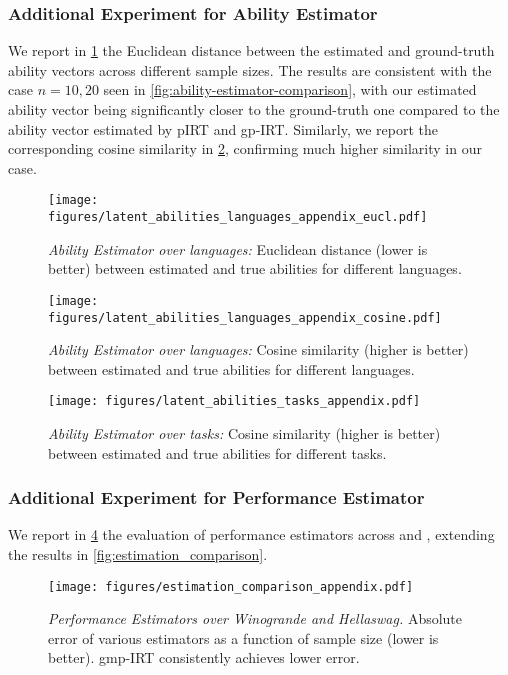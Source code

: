 \subsubsection{Additional Experiment for Ability Estimator}
We report in \cref{fig:ability-estimator-comparison-all} the Euclidean distance between the estimated and ground-truth ability vectors across different sample sizes. The results are consistent with the case $n=10, 20$ seen in \cref{fig:ability-estimator-comparison}, with our estimated ability vector being significantly closer to the ground-truth one compared to the ability vector estimated by pIRT and gp-IRT. Similarly, we report the corresponding cosine similarity in \cref{fig:ability-estimator-comparison-cosine}, confirming much higher similarity in our case.  
%
\begin{figure}
    \texttt{[image: figures/latent\_abilities\_languages\_appendix\_eucl.pdf]}
    \caption{\textit{Ability Estimator over languages:} Euclidean distance (lower is better) between estimated and true abilities for different languages.}
    \label{fig:ability-estimator-comparison-all}
\end{figure}
%
\begin{figure}
    \texttt{[image: figures/latent\_abilities\_languages\_appendix\_cosine.pdf]}
    \caption{\textit{Ability Estimator over languages:} Cosine similarity (higher is better) between estimated and true abilities for different languages.}
    \label{fig:ability-estimator-comparison-cosine}
\end{figure}
%
\begin{figure}
    \texttt{[image: figures/latent\_abilities\_tasks\_appendix.pdf]}
    \caption{\textit{Ability Estimator over tasks:} Cosine similarity (higher is better) between estimated and true abilities for different tasks.}
    \label{fig:ability-estimator-comparison-cosine-tasks}
\end{figure}
%
\subsubsection{Additional Experiment for Performance Estimator} 
We report in \cref{fig:estimation_comparison_winogrande_hellaswag} the evaluation of performance estimators across  and , extending the results in \cref{fig:estimation_comparison}.

\begin{figure}
    \centering
    \texttt{[image: figures/estimation\_comparison\_appendix.pdf]}
    \caption{\textit{Performance Estimators over Winogrande and Hellaswag.} Absolute error of various estimators as a function of sample size (lower is better). gmp-IRT consistently achieves lower error.}
\label{fig:estimation_comparison_winogrande_hellaswag}
\end{figure}

